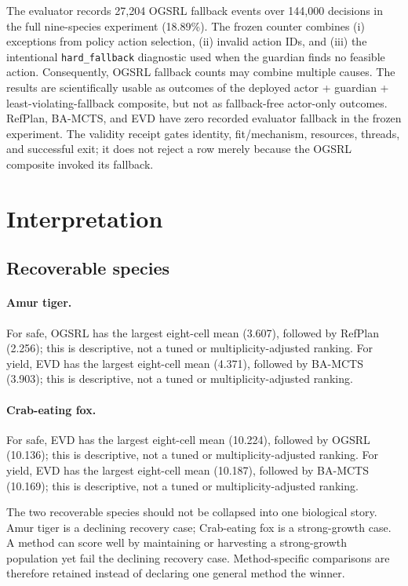 \documentclass[10pt]{article}
\begin{document}
The evaluator records 27,204 OGSRL fallback events over 144,000 decisions in the full nine-species
experiment (18.89\%). The frozen counter combines (i) exceptions from policy action selection,
(ii) invalid action IDs, and (iii) the intentional \texttt{hard\_fallback} diagnostic used when the
guardian finds no feasible action. Consequently, OGSRL fallback counts may combine multiple causes.
The results are scientifically usable as outcomes of the deployed actor + guardian +
least-violating-fallback composite, but not as fallback-free actor-only outcomes. RefPlan, BA-MCTS,
and EVD have zero recorded evaluator fallback in the frozen experiment. The validity receipt gates
identity, fit/mechanism, resources, threads, and successful exit; it does not reject a row merely
because the OGSRL composite invoked its fallback.

\section{Interpretation}
\subsection{Recoverable species}

\paragraph{Amur tiger.} For safe, OGSRL has the largest eight-cell mean (3.607), followed by RefPlan (2.256); this is descriptive, not a tuned or multiplicity-adjusted ranking. For yield, EVD has the largest eight-cell mean (4.371), followed by BA-MCTS (3.903); this is descriptive, not a tuned or multiplicity-adjusted ranking.
\paragraph{Crab-eating fox.} For safe, EVD has the largest eight-cell mean (10.224), followed by OGSRL (10.136); this is descriptive, not a tuned or multiplicity-adjusted ranking. For yield, EVD has the largest eight-cell mean (10.187), followed by BA-MCTS (10.169); this is descriptive, not a tuned or multiplicity-adjusted ranking.

The two recoverable species should not be collapsed into one biological story. Amur tiger is a
declining recovery case; Crab-eating fox is a strong-growth case. A method can score well by
maintaining or harvesting a strong-growth population yet fail the declining recovery case.
Method-specific comparisons are therefore retained instead of declaring one general method the
winner.
\end{document}
